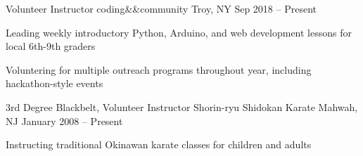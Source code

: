 \begin{cventries}
  \cventry
  {Volunteer Instructor}
  {coding\&\&community}
  {Troy, NY}
  {Sep 2018 -- Present}
  {
    \begin{cvitems}
      \item Leading weekly introductory Python, Arduino, and web development lessons for local 6th-9th graders
      \item Voluntering for multiple outreach programs throughout year, including hackathon-style events
    \end{cvitems}
  }


  \cventry
  {3rd Degree Blackbelt, Volunteer Instructor}
  {Shorin-ryu Shidokan Karate}
  {Mahwah, NJ}
  {January 2008 -- Present}
  {
    \begin{cvitems}
      \item Instructing traditional Okinawan karate classes for children and adults
    \end{cvitems}
  }


\end{cventries}